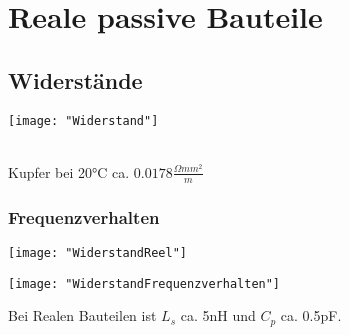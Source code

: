 \section{Reale passive Bauteile}

\subsection{Widerstände}


\begin{minipage}[t]{0.3\textwidth}
	\vspace{0pt}
	\texttt{[image: "Widerstand"]}
\end{minipage}\hspace{0.05\textwidth}
\begin{minipage}[t]{0.3\textwidth}
	\vspace{0pt}
	\\
	Kupfer bei 20°C ca. $0.0178 \frac{\Omega mm^2}{m}$
\end{minipage}\hspace{0.05\textwidth}
\begin{minipage}[t]{0.3\textwidth}
\end{minipage}
\vspace{2mm}

\subsubsection{Frequenzverhalten}
\begin{minipage}[t]{0.3\textwidth}
	\vspace{0pt}
	\texttt{[image: "WiderstandReel"]}
\end{minipage}\hspace{0.05\textwidth}
\begin{minipage}[t]{0.3\textwidth}
	\vspace{0pt}
	\texttt{[image: "WiderstandFrequenzverhalten"]}
\end{minipage}\hspace{0.05\textwidth}
\begin{minipage}[t]{0.3\textwidth}
	Bei Realen Bauteilen ist $L_s$ ca. 5nH und $C_p$ ca. 0.5pF.
\end{minipage}
\vspace{2mm}

